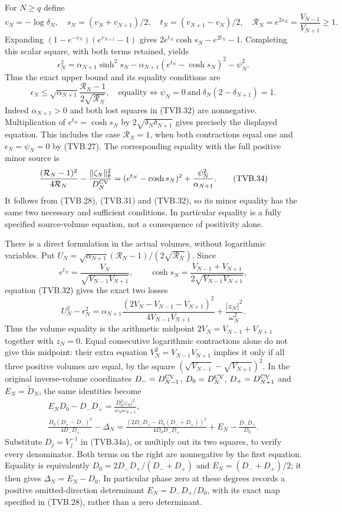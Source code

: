 \documentclass[11pt]{article}
\begin{document}
For $N\ge q$ define
\[
 v_N=-\log\delta_N,\quad
 s_N=(v_N+v_{N+1})/2,\quad t_N=(v_{N+1}-v_N)/2,\quad
 \mathcal R_N=e^{2s_N}=\frac{V_{N-1}}{V_{N+1}}\ge1.
\]
Expanding $(1-e^{-v_N})(e^{v_{N+1}}-1)$ gives
$2e^{t_N}\cosh s_N-e^{2t_N}-1$.
Completing this scalar square, with both terms retained, yields
\[
 \boxed{\epsilon_N^2
 =\alpha_{N+1}\sinh^2s_N
 -\alpha_{N+1}(e^{t_N}-\cosh s_N)^2-\psi_N^2.}
 \tag{TVB.32}
\]
Thus the exact upper bound and its equality conditions are
\[
 \epsilon_N\le\sqrt{\alpha_{N+1}}
                 \frac{\mathcal R_N-1}{2\sqrt{\mathcal R_N}},
 \quad
 \text{equality}\iff
 \psi_N=0\ \text{and}\ \delta_N(2-\delta_{N+1})=1.
 \tag{TVB.33}
\]
Indeed $\alpha_{N+1}>0$ and both lost squares in (TVB.32) are
nonnegative. Multiplication of
$e^{t_N}=\cosh s_N$ by $2\sqrt{\delta_N\delta_{N+1}}$
gives precisely the displayed equation. This includes the case
$\mathcal R_N=1$, when both contractions equal one and
$\epsilon_N=\psi_N=0$ by (TVB.27).
The corresponding equality with the full positive minor source is
\[
 \frac{(\mathcal R_N-1)^2}{4\mathcal R_N}
 -\frac{\|\zeta_N\|_\theta^2}{D_N^{\rm CV}}
 =(e^{t_N}-\cosh s_N)^2+\frac{\psi_N^2}{\alpha_{N+1}}.
 \tag{TVB.34}
\]
It follows from (TVB.28), (TVB.31) and (TVB.32), so its
minor equality has the same two necessary and sufficient conditions.
In particular equality is a fully specified source-volume equation,
not a consequence of positivity alone.

There is a direct formulation in the actual volumes, without
logarithmic variables. Put $U_N=\sqrt{\alpha_{N+1}}
(\mathcal R_N-1)/(2\sqrt{\mathcal R_N})$. Since
\[
 e^{t_N}=\frac{V_N}{\sqrt{V_{N-1}V_{N+1}}},\qquad
 \cosh s_N=\frac{V_{N-1}+V_{N+1}}
                    {2\sqrt{V_{N-1}V_{N+1}}},
\]
equation (TVB.32) gives the exact two losses
\[
 U_N^2-\epsilon_N^2
 =\alpha_{N+1}
   \frac{(2V_N-V_{N-1}-V_{N+1})^2}{4V_{N-1}V_{N+1}}
  +\frac{|z_N|^2}{\omega_N^2}.
 \tag{TVB.34a}
\]
Thus the volume equality is the arithmetic midpoint
$2V_N=V_{N-1}+V_{N+1}$ together with $z_N=0$.
Equal consecutive logarithmic contractions alone do not give this
midpoint: their extra equation $V_N^2=V_{N-1}V_{N+1}$ implies it
only if all three positive volumes are equal, by the square
$(\sqrt{V_{N-1}}-\sqrt{V_{N+1}})^2$.
In the original inverse-volume coordinates
$D_-=D_{N-1}^{\rm CV}$, $D_0=D_N^{\rm CV}$,
$D_+=D_{N+1}^{\rm CV}$ and $E_N=\widetilde D_N$, the same
identities become
\[
 \begin{gathered}
 E_ND_0-D_-D_+
     =\frac{D_0^2|z_N|^2}{\omega_N\omega_{N+1}},\\
 \frac{D_0(D_+-D_-)^2}{4D_-D_+}-\Delta_N
 =\frac{(2D_-D_+-D_0(D_-+D_+))^2}{4D_0D_-D_+}
       +E_N-\frac{D_-D_+}{D_0}.
 \end{gathered}
 \tag{TVB.34b}
\]
Substitute $D_j=V_j^{-1}$ in (TVB.34a), or multiply out its two
squares, to verify every denominator. Both terms on the right
are nonnegative by the first equation. Equality is equivalently
$D_0=2D_-D_+/(D_-+D_+)$ and
$E_N=(D_-+D_+)/2$; it then gives $\Delta_N=E_N-D_0$.
In particular phase zero at these degrees records a positive
omitted-direction determinant $E_N=D_-D_+/D_0$, with its exact
map specified in (TVB.28), rather than a zero determinant.
\end{document}

